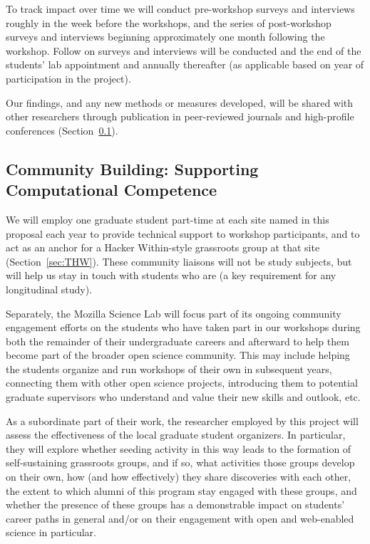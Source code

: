 \documentclass{proposalnsf}
\newlength{\up}
\begin{document}
To track impact over time we will conduct pre-workshop surveys 
and interviews roughly in the week before the workshops, and the
series of post-workshop surveys and interviews beginning approximately 
one month following the workshop. Follow on surveys and interviews
will be conducted and the end of the students' lab appointment 
and annually thereafter (as applicable based on year of participation
in the project).

Our findings, and any new methods or measures developed, will be
shared with other researchers through publication in peer-reviewed
journals and high-profile conferences (Section~\ref{sec:pub}).

\subsection{Community Building: Supporting Computational Competence}
\label{sec:pub}

We will employ one graduate student part-time at each site named in this proposal each year to provide technical support to workshop participants,
and to act as an anchor for a Hacker Within-style grassroots group at
that site (Section~\ref{sec:THW}).  These community liaisons will not
be study subjects, but will help us stay in touch with students who
are (a key requirement for any longitudinal study).

Separately, the Mozilla Science Lab will focus part of its ongoing
community engagement efforts on the students who have taken part in
our workshops during both the remainder of their undergraduate careers
and afterward to help them become part of the broader
open science community.  This may include helping the students
organize and run workshops of their own in subsequent years,
connecting them with other open science projects, introducing them to
potential graduate supervisors who understand and value their new
skills and outlook, etc.

As a subordinate part of their work, the researcher employed by this
project will assess the effectiveness of the local graduate student
organizers.  In particular, they will explore whether seeding activity
in this way leads to the formation of self-sustaining grassroots
groups, and if so, what activities those groups develop on their own,
how (and how effectively) they share discoveries with each other, the
extent to which alumni of this program stay engaged with these groups,
and whether the presence of these groups has a demonstrable impact on
students' career paths in general and/or on their engagement with
open and web-enabled science in particular.
\end{document}
